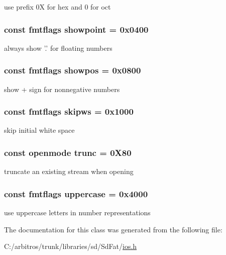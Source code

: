 use prefix 0\-X for hex and 0 for oct \hypertarget{classios__base_a67e83af7da73436945ac77741e67a14f}{
\subsubsection[{showpoint}]{\setlength{\rightskip}{0pt plus 5cm}const {\bf fmtflags} showpoint = 0x0400\hspace{0.3cm}{\ttfamily [static]}}}\label{classios__base_a67e83af7da73436945ac77741e67a14f}
always show '.' for floating numbers \hypertarget{classios__base_a1d8cc21b958994159e17e0ff8d06e615}{
\subsubsection[{showpos}]{\setlength{\rightskip}{0pt plus 5cm}const {\bf fmtflags} showpos = 0x0800\hspace{0.3cm}{\ttfamily [static]}}}\label{classios__base_a1d8cc21b958994159e17e0ff8d06e615}
show + sign for nonnegative numbers \hypertarget{classios__base_a49e9a402efc1522af1ee3af7595559a4}{
\subsubsection[{skipws}]{\setlength{\rightskip}{0pt plus 5cm}const {\bf fmtflags} skipws = 0x1000\hspace{0.3cm}{\ttfamily [static]}}}\label{classios__base_a49e9a402efc1522af1ee3af7595559a4}
skip initial white space \hypertarget{classios__base_a19dcd0116327467d34feaa1a15733e4c}{
\subsubsection[{trunc}]{\setlength{\rightskip}{0pt plus 5cm}const {\bf openmode} trunc = 0\-X80\hspace{0.3cm}{\ttfamily [static]}}}\label{classios__base_a19dcd0116327467d34feaa1a15733e4c}
truncate an existing stream when opening \hypertarget{classios__base_a6e815a500247ed4d6ba2bb43965c47fa}{
\subsubsection[{uppercase}]{\setlength{\rightskip}{0pt plus 5cm}const {\bf fmtflags} uppercase = 0x4000\hspace{0.3cm}{\ttfamily [static]}}}\label{classios__base_a6e815a500247ed4d6ba2bb43965c47fa}
use uppercase letters in number representations 

The documentation for this class was generated from the following file\-:\begin{DoxyCompactItemize}
\item 
C\-:/arbitros/trunk/libraries/sd/\-Sd\-Fat/\hyperlink{ios_8h}{ios.\-h}\end{DoxyCompactItemize}
